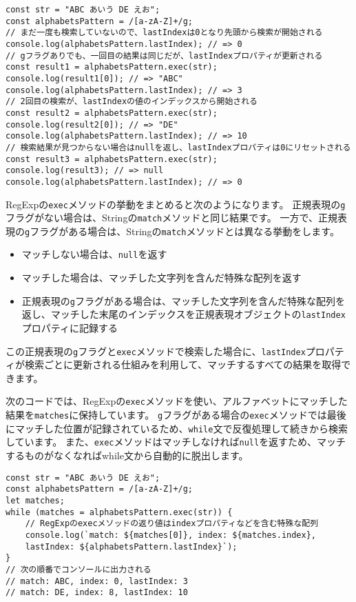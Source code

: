 \begin{tcolorbox}[enhanced jigsaw,breakable,title=RegExp.prototype.execでのString.prototype.matchAll]
\begin{lstlisting}
const str = "ABC あいう DE えお";
const alphabetsPattern = /[a-zA-Z]+/g;
// まだ一度も検索していないので、lastIndexは0となり先頭から検索が開始される
console.log(alphabetsPattern.lastIndex); // => 0
// gフラグありでも、一回目の結果は同じだが、lastIndexプロパティが更新される
const result1 = alphabetsPattern.exec(str);
console.log(result1[0]); // => "ABC"
console.log(alphabetsPattern.lastIndex); // => 3
// 2回目の検索が、lastIndexの値のインデックスから開始される
const result2 = alphabetsPattern.exec(str);
console.log(result2[0]); // => "DE"
console.log(alphabetsPattern.lastIndex); // => 10
// 検索結果が見つからない場合はnullを返し、lastIndexプロパティは0にリセットされる
const result3 = alphabetsPattern.exec(str);
console.log(result3); // => null
console.log(alphabetsPattern.lastIndex); // => 0
\end{lstlisting}

RegExpの\texttt{exec}メソッドの挙動をまとめると次のようになります。
正規表現の\texttt{g}フラグがない場合は、Stringの\texttt{match}メソッドと同じ結果です。
一方で、正規表現の\texttt{g}フラグがある場合は、Stringの\texttt{match}メソッドとは異なる挙動をします。

\begin{itemize}
\item
  マッチしない場合は、\texttt{null}を返す
\item
  マッチした場合は、マッチした文字列を含んだ特殊な配列を返す
\item
  正規表現の\texttt{g}フラグがある場合は、マッチした文字列を含んだ特殊な配列を返し、マッチした末尾のインデックスを正規表現オブジェクトの\texttt{lastIndex}プロパティに記録する
\end{itemize}

この正規表現の\texttt{g}フラグと\texttt{exec}メソッドで検索した場合に、\texttt{lastIndex}プロパティが検索ごとに更新される仕組みを利用して、マッチするすべての結果を取得できます。

次のコードでは、RegExpの\texttt{exec}メソッドを使い、アルファベットにマッチした結果を\texttt{matches}に保持しています。
\texttt{g}フラグがある場合の\texttt{exec}メソッドでは最後にマッチした位置が記録されているため、\texttt{while}文で反復処理して続きから検索しています。
また、\texttt{exec}メソッドはマッチしなければ\texttt{null}を返すため、マッチするものがなくなればwhile文から自動的に脱出します。

\begin{lstlisting}
const str = "ABC あいう DE えお";
const alphabetsPattern = /[a-zA-Z]+/g;
let matches;
while (matches = alphabetsPattern.exec(str)) {
    // RegExpのexecメソッドの返り値はindexプロパティなどを含む特殊な配列
    console.log(`match: ${matches[0]}, index: ${matches.index}, 
    lastIndex: ${alphabetsPattern.lastIndex}`);
}
// 次の順番でコンソールに出力される
// match: ABC, index: 0, lastIndex: 3
// match: DE, index: 8, lastIndex: 10
\end{lstlisting}


\end{tcolorbox}

